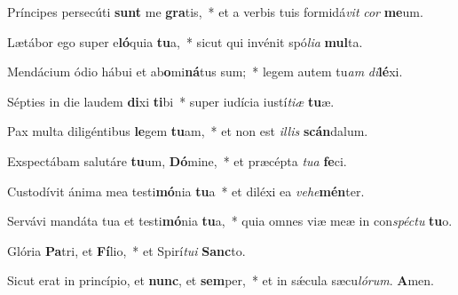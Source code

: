 \item Príncipes persecúti \textbf{sunt} me \textbf{gra}tis,~* et a verbis tuis formidá\textit{vit} \textit{cor} \textbf{me}um.

\item Lætábor ego super e\textbf{ló}quia \textbf{tu}a,~* sicut qui invénit spó\textit{lia} \textbf{mul}ta.

\item Mendácium ódio hábui et ab\textbf{o}mi\textbf{ná}tus sum;~* legem autem tu\textit{am} \textit{di}\textbf{lé}xi.

\item Sépties in die laudem \textbf{di}xi \textbf{ti}bi~* super iudícia iustí\textit{tiæ} \textbf{tu}æ.

\item Pax multa diligéntibus \textbf{le}gem \textbf{tu}am,~* et non est \textit{illis} \textbf{scán}dalum.

\item Exspectábam salutáre \textbf{tu}um, \textbf{Dó}mine,~* et præcépta \textit{tua} \textbf{fe}ci.

\item Custodívit ánima mea testi\textbf{mó}nia \textbf{tu}a~* et diléxi ea \textit{vehe}\textbf{mén}ter.

\item Servávi mandáta tua et testi\textbf{mó}nia \textbf{tu}a,~* quia omnes viæ meæ in con\textit{spéctu} \textbf{tu}o.

\item Glória \textbf{Pa}tri, et \textbf{Fí}lio,~* et Spirí\textit{tui} \textbf{Sanc}to.

\item Sicut erat in princípio, et \textbf{nunc}, et \textbf{sem}per,~* et in sǽcula sæcu\textit{lórum}. \textbf{A}men.